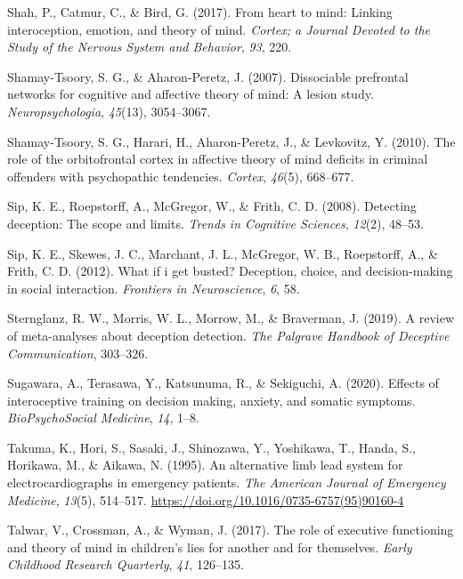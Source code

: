 \documentclass[
  man,mask,floatsintext]{apa6}
\newlength{\cslhangindent}
\newlength{\cslentryspacingunit} %
\newenvironment{CSLReferences}[2] %
 {%
  \setlength{\parindent}{0pt}
  \ifodd #1
  \let\oldpar\par
  \def\par{\hangindent=\cslhangindent\oldpar}
  \fi
  \setlength{\parskip}{#2\cslentryspacingunit}
 }%
 {}
\begin{document}
\begin{CSLReferences}{1}{0}
\leavevmode{}%
Shah, P., Catmur, C., \& Bird, G. (2017). From heart to mind: Linking interoception, emotion, and theory of mind. \emph{Cortex; a Journal Devoted to the Study of the Nervous System and Behavior}, \emph{93}, 220.

\leavevmode{}%
Shamay-Tsoory, S. G., \& Aharon-Peretz, J. (2007). Dissociable prefrontal networks for cognitive and affective theory of mind: A lesion study. \emph{Neuropsychologia}, \emph{45}(13), 3054--3067.

\leavevmode{}%
Shamay-Tsoory, S. G., Harari, H., Aharon-Peretz, J., \& Levkovitz, Y. (2010). The role of the orbitofrontal cortex in affective theory of mind deficits in criminal offenders with psychopathic tendencies. \emph{Cortex}, \emph{46}(5), 668--677.

\leavevmode{}%
Sip, K. E., Roepstorff, A., McGregor, W., \& Frith, C. D. (2008). Detecting deception: The scope and limits. \emph{Trends in Cognitive Sciences}, \emph{12}(2), 48--53.

\leavevmode{}%
Sip, K. E., Skewes, J. C., Marchant, J. L., McGregor, W. B., Roepstorff, A., \& Frith, C. D. (2012). What if i get busted? Deception, choice, and decision-making in social interaction. \emph{Frontiers in Neuroscience}, \emph{6}, 58.

\leavevmode{}%
Sternglanz, R. W., Morris, W. L., Morrow, M., \& Braverman, J. (2019). A review of meta-analyses about deception detection. \emph{The Palgrave Handbook of Deceptive Communication}, 303--326.

\leavevmode{}%
Sugawara, A., Terasawa, Y., Katsunuma, R., \& Sekiguchi, A. (2020). Effects of interoceptive training on decision making, anxiety, and somatic symptoms. \emph{BioPsychoSocial Medicine}, \emph{14}, 1--8.

\leavevmode{}%
Takuma, K., Hori, S., Sasaki, J., Shinozawa, Y., Yoshikawa, T., Handa, S., Horikawa, M., \& Aikawa, N. (1995). An alternative limb lead system for electrocardiographs in emergency patients. \emph{The American Journal of Emergency Medicine}, \emph{13}(5), 514--517. \url{https://doi.org/10.1016/0735-6757(95)90160-4}

\leavevmode{}%
Talwar, V., Crossman, A., \& Wyman, J. (2017). The role of executive functioning and theory of mind in children's lies for another and for themselves. \emph{Early Childhood Research Quarterly}, \emph{41}, 126--135.


\end{CSLReferences}
\end{document}
